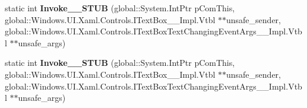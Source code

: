 \begin{DoxyCompactItemize}
static int {\bfseries Invoke\+\_\+\+\_\+\+S\+T\+UB} (global\+::\+System.\+Int\+Ptr p\+Com\+This, global\+::\+Windows.\+U\+I.\+Xaml.\+Controls.\+I\+Text\+Box\+\_\+\+\_\+\+Impl.\+Vtbl $\ast$$\ast$unsafe\+\_\+sender, global\+::\+Windows.\+U\+I.\+Xaml.\+Controls.\+I\+Text\+Box\+Text\+Changing\+Event\+Args\+\_\+\+\_\+\+Impl.\+Vtbl $\ast$$\ast$unsafe\+\_\+args)
\item 
\mbox{\label{struct_windows_1_1_foundation_1_1_typed_event_handler___a___windows___u_i___xaml___controls___tef88d8535df07672acd9dfc6e3861f1e1_a44fe6abb99cf85895c5971b4717ed021}} 
static int {\bfseries Invoke\+\_\+\+\_\+\+S\+T\+UB} (global\+::\+System.\+Int\+Ptr p\+Com\+This, global\+::\+Windows.\+U\+I.\+Xaml.\+Controls.\+I\+Text\+Box\+\_\+\+\_\+\+Impl.\+Vtbl $\ast$$\ast$unsafe\+\_\+sender, global\+::\+Windows.\+U\+I.\+Xaml.\+Controls.\+I\+Text\+Box\+Text\+Changing\+Event\+Args\+\_\+\+\_\+\+Impl.\+Vtbl $\ast$$\ast$unsafe\+\_\+args)
\end{DoxyCompactItemize}
